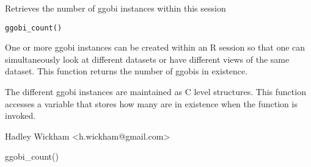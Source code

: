 \begin{Description}\relax
Retrieves the number of ggobi instances within this session
\end{Description}
\begin{Usage}
\begin{verbatim}ggobi_count()\end{verbatim}
\end{Usage}
\begin{Arguments}
\end{Arguments}
\begin{Details}\relax
One or more ggobi instances can be created within an R session so that one
can simultaneously look at different datasets or have different views
of the same dataset.  This function returns the number of ggobis in existence.

The different ggobi instances are maintained as C  level structures.
This function accesses a variable that stores how many are in existence
when the function is invoked.
\end{Details}
\begin{Author}\relax
Hadley Wickham <h.wickham@gmail.com>
\end{Author}
\begin{Examples}
\begin{ExampleCode}ggobi_count()\end{ExampleCode}
\end{Examples}

